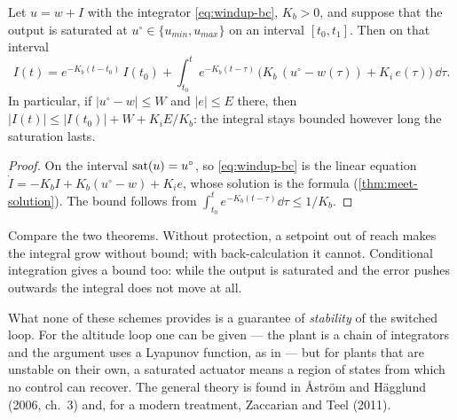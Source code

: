\begin{theorem}
\label{thm:windup-bc}
Let $u = w + I$ with the integrator \eqref{eq:windup-bc}, $K_b > 0$, and suppose that the output is saturated at $u^\circ \in \{u_{min}, u_{max}\}$ on an interval $[t_0, t_1]$. Then on that interval
\begin{equation*}
  I(t) = e^{-K_b(t - t_0)}\,I(t_0) + \int_{t_0}^{t} e^{-K_b(t - \tau)}\,\big(K_b\,(u^\circ - w(\tau)) + K_i\,e(\tau)\big)\,\dd\tau .
\end{equation*}
In particular, if $|u^\circ - w| \le W$ and $|e| \le E$ there, then $|I(t)| \le |I(t_0)| + W + K_iE/K_b$: the integral stays bounded however long the saturation lasts.
\end{theorem}
\begin{proof}
On the interval $\operatorname{sat}(u) = u^\circ$, so \cref{eq:windup-bc} is the linear equation $\dot I = -K_b I + K_b(u^\circ - w) + K_i e$, whose solution is the formula (\cref{thm:meet-solution}). The bound follows from $\int_{t_0}^t e^{-K_b(t-\tau)}\dd\tau \le 1/K_b$.
\end{proof}

Compare the two theorems. Without protection, a setpoint out of reach makes the integral grow without bound; with back-calculation it cannot. Conditional integration gives a bound too: while the output is saturated and the error pushes outwards the integral does not move at all.

What none of these schemes provides is a guarantee of \emph{stability} of the switched loop. For the altitude loop one can be given — the plant is a chain of integrators and the argument uses a Lyapunov function, as in  — but for plants that are unstable on their own, a saturated actuator means a region of states from which no control can recover. The general theory is found in Åström and Hägglund (2006, ch.~3) and, for a modern treatment, Zaccarian and Teel (2011).

